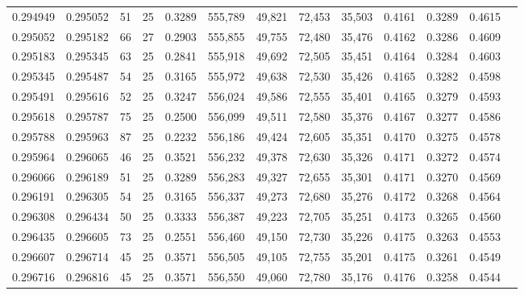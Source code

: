 \begin{tabular}{rrrrrrrrrrrrr}
0.294949 & 0.295052 &    51 &  25 &                                     0.3289 & 555,789 &  49,821 &  72,453 &  35,503 & 0.4161 & 0.3289 & 0.4615 \\
0.295052 & 0.295182 &    66 &  27 &                                     0.2903 & 555,855 &  49,755 &  72,480 &  35,476 & 0.4162 & 0.3286 & 0.4609 \\
0.295183 & 0.295345 &    63 &  25 &                                     0.2841 & 555,918 &  49,692 &  72,505 &  35,451 & 0.4164 & 0.3284 & 0.4603 \\
0.295345 & 0.295487 &    54 &  25 &                                     0.3165 & 555,972 &  49,638 &  72,530 &  35,426 & 0.4165 & 0.3282 & 0.4598 \\
0.295491 & 0.295616 &    52 &  25 &                                     0.3247 & 556,024 &  49,586 &  72,555 &  35,401 & 0.4165 & 0.3279 & 0.4593 \\
0.295618 & 0.295787 &    75 &  25 &                                     0.2500 & 556,099 &  49,511 &  72,580 &  35,376 & 0.4167 & 0.3277 & 0.4586 \\
0.295788 & 0.295963 &    87 &  25 &                                     0.2232 & 556,186 &  49,424 &  72,605 &  35,351 & 0.4170 & 0.3275 & 0.4578 \\
0.295964 & 0.296065 &    46 &  25 &                                     0.3521 & 556,232 &  49,378 &  72,630 &  35,326 & 0.4171 & 0.3272 & 0.4574 \\
0.296066 & 0.296189 &    51 &  25 &                                     0.3289 & 556,283 &  49,327 &  72,655 &  35,301 & 0.4171 & 0.3270 & 0.4569 \\
0.296191 & 0.296305 &    54 &  25 &                                     0.3165 & 556,337 &  49,273 &  72,680 &  35,276 & 0.4172 & 0.3268 & 0.4564 \\
0.296308 & 0.296434 &    50 &  25 &                                     0.3333 & 556,387 &  49,223 &  72,705 &  35,251 & 0.4173 & 0.3265 & 0.4560 \\
0.296435 & 0.296605 &    73 &  25 &                                     0.2551 & 556,460 &  49,150 &  72,730 &  35,226 & 0.4175 & 0.3263 & 0.4553 \\
0.296607 & 0.296714 &    45 &  25 &                                     0.3571 & 556,505 &  49,105 &  72,755 &  35,201 & 0.4175 & 0.3261 & 0.4549 \\
0.296716 & 0.296816 &    45 &  25 &                                     0.3571 & 556,550 &  49,060 &  72,780 &  35,176 & 0.4176 & 0.3258 & 0.4544 \\

\end{tabular}
